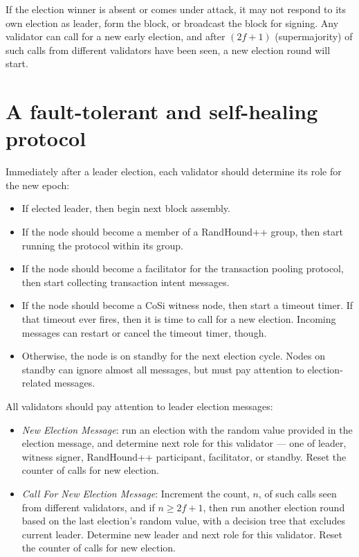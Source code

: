 \documentclass[8pt,fleqn,openany]{book}
\begin{document}
If the election winner is absent or comes under attack, it may not respond to its own election as leader, form the block, or broadcast the block for signing. Any validator can call for a new early election, and after $(2 f+1)$ (supermajority) of such calls from different validators have been seen, a new election round will start.

\section{A fault-tolerant and self-healing protocol} 
Immediately after a leader election, each validator should determine its role for the new epoch:


\begin{itemize}
  \item If elected leader, then begin next block assembly. 
  \item If the node should become a member of a RandHound++ group, then start running the protocol within its group.
  \item If the node should become a facilitator for the transaction pooling protocol, then start collecting transaction intent messages.
  \item If the node should become a CoSi witness node, then start a timeout timer. If that timeout ever fires, then it is time to call for a new election. Incoming messages can restart or cancel the timeout timer, though.
  \item Otherwise, the node is on standby for the next election cycle. Nodes on standby can ignore almost all messages, but must pay attention to election-related messages.
\end{itemize}  

All validators should pay attention to leader election messages:

\begin{itemize}
  \item{\em New Election Message}: run an election with the random value provided in the election message, and determine next role for this validator — one of leader, witness signer, RandHound++ participant, facilitator, or standby. Reset the counter of calls for new election.
  \item{\em Call For New Election Message}: Increment the count, $n$, of such calls seen from different validators, and if $n \ge 2 f +1$, then run another election round based on the last election’s random value, with a decision tree that excludes current leader. Determine new leader and next role for this validator. Reset the counter of calls for new election.
\end{itemize}
\end{document}
